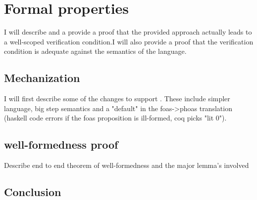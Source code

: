 \chapter{Formal properties}
\label{cha:3}
I will describe and a provide a proof that the provided approach actually leads to a well-scoped verification condition.I will also provide a proof that the verification condition is adequate against the semantics of the language.

\section{Mechanization}
I will first describe some of the changes to support . These include simpler language, big step semantics and a "default" in the foas->phoas translation (haskell code errors if the foas proposition is ill-formed, coq picks "lit 0").

\section{well-formedness proof}
Describe end to end theorem of well-formedness and the major lemma's involved



\section{Conclusion}

